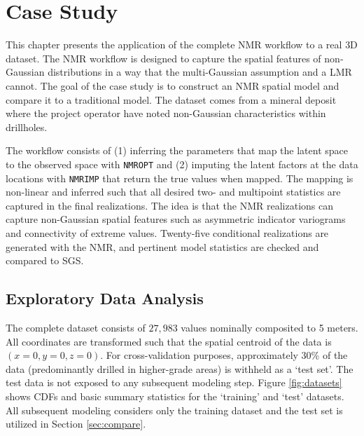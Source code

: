 
\chapter{Case Study}
\label{ch:casestudy}

This chapter presents the application of the complete \gls{NMR} workflow to a real \gls{3D} dataset. The \gls{NMR} workflow is designed to capture the spatial features of non‐Gaussian distributions in a way that the multi-Gaussian assumption and a \gls{LMR} cannot. The goal of the case study is to construct an \gls{NMR} spatial model and compare it to a traditional model. The dataset comes from a mineral deposit where the project operator have noted non-Gaussian characteristics within drillholes.

The workflow consists of (1) inferring the parameters that map the latent space to the observed space with \texttt{NMROPT} and (2) imputing the latent factors at the data locations with \texttt{NMRIMP} that return the true values when mapped. The mapping is non-linear and inferred such that all desired two- and multipoint statistics are captured in the final realizations. The idea is that the \gls{NMR} realizations can capture non-Gaussian spatial features such as asymmetric indicator variograms and connectivity of extreme values. Twenty-five conditional realizations are generated with the \gls{NMR}, and pertinent model statistics are checked and compared to \gls{SGS}.

\FloatBarrier
\section{Exploratory Data Analysis}
\label{sec:eda}

The complete dataset consists of $27,983$ values nominally composited to 5 meters. All coordinates are transformed such that the spatial centroid of the data is $(x=0,y=0,z=0)$. For cross-validation purposes, approximately 30\% of the data (predominantly drilled in higher-grade areas) is withheld as a `test set'. The test data is not exposed to any subsequent modeling step. Figure \ref{fig:datasets} shows \glspl{CDF} and basic summary statistics for the `training' and `test' datasets. All subsequent modeling considers only the training dataset and the test set is utilized in Section \ref{sec:compare}.

